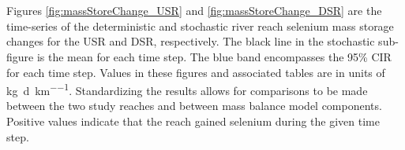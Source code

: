 \subtabletop
\begin{table}[htbp]
	\centering
	\caption[DSR river segment deterministic and stochastic dissolved selenium mass storage change results tables.]{DSR river segment deterministic and stochastic dissolved selenium mass storage change results tables.  Values are in units of \si{\kilo\gram\per\day\per\kilo\meter}.}
	\label{tab:massSegmentStoreChange_DSR}
	\begin{subtable}{\textwidth}
		\centering
		
	\end{subtable}\\
	\tablevspace
	\begin{subtable}{\textwidth}
		\centering
		
	\end{subtable}\\
\end{table}

\clearpage{}


Figures \ref{fig:massStoreChange_USR} and \ref{fig:massStoreChange_DSR} are the time-series of the deterministic and stochastic river reach selenium mass storage changes for the USR and DSR, respectively.  The black line in the stochastic sub-figure is the mean for each time step.  The blue band encompasses the 95\% CIR for each time step.  Values in these figures and associated tables are in units of \si{\kilo\gram\per\day\per\kilo\meter}.  Standardizing the results allows for comparisons to be made between the two study reaches and between mass balance model components.  Positive values indicate that the reach gained selenium during the given time step.

